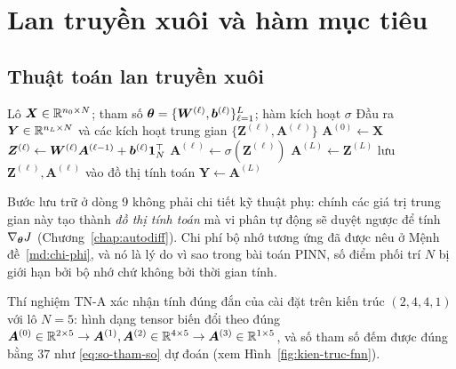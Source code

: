 \section{Lan truyền xuôi và hàm mục tiêu}
\label{sec:lantruyenxuoi}
 
\subsection{Thuật toán lan truyền xuôi}
 
\begin{algorithm}[H]
\caption{Lan truyền xuôi trên một lô dữ liệu}
\label{alg:forward}
\begin{algorithmic}[1]
\Require Lô $\bm{X} \in \mathbb{R}^{n_0 \times N}$; tham số
  $\bm{\theta}=\{\bm{W}^{(\ell)},\bm{b}^{(\ell)}\}_{\ell=1}^{L}$; hàm kích hoạt $\sigma$
\Ensure Đầu ra $\bm{Y} \in \mathbb{R}^{n_L \times N}$ và các kích hoạt trung gian
  $\{\bm{Z}^{(\ell)},\bm{A}^{(\ell)}\}$
\State $\bm{A}^{(0)} \gets \bm{X}$
  \State $\bm{Z}^{(\ell)} \gets \bm{W}^{(\ell)}\bm{A}^{(\ell-1)}
          + \bm{b}^{(\ell)}\bm{1}_N^{\top}$
    \Comment{\eqref{eq:batch}}
    \State $\bm{A}^{(\ell)} \gets \sigma\!\left(\bm{Z}^{(\ell)}\right)$
  \Else
    \State $\bm{A}^{(L)} \gets \bm{Z}^{(L)}$
  \EndIf
  \State lưu $\bm{Z}^{(\ell)}, \bm{A}^{(\ell)}$ vào đồ thị tính toán
\EndFor
\State \Return $\bm{Y} \gets \bm{A}^{(L)}$
\end{algorithmic}
\end{algorithm}
 
Bước lưu trữ ở dòng 9 không phải chi tiết kỹ thuật phụ: chính các giá trị trung
gian này tạo thành \emph{đồ thị tính toán} mà vi phân tự động sẽ duyệt ngược để
tính $\nabla_{\bm{\theta}} J$ (Chương~\ref{chap:autodiff}). Chi phí bộ nhớ tương ứng
đã được nêu ở Mệnh đề~\ref{md:chi-phi}, và nó là lý do vì sao trong bài toán
PINN, số điểm phối trí $N$ bị giới hạn bởi bộ nhớ chứ không bởi thời gian tính.
 
Thí nghiệm TN-A xác nhận tính đúng đắn của cài đặt trên kiến trúc $(2,4,4,1)$ với
lô $N = 5$: hình dạng tensor biến đổi theo đúng
$\bm{A}^{(0)} \in \mathbb{R}^{2\times5} \to \bm{A}^{(1)},\bm{A}^{(2)} \in \mathbb{R}^{4\times5}
\to \bm{A}^{(3)} \in \mathbb{R}^{1\times5}$, và số tham số đếm được đúng bằng $37$ như
\eqref{eq:so-tham-so} dự đoán (xem Hình~\ref{fig:kien-truc-fnn}).
 
